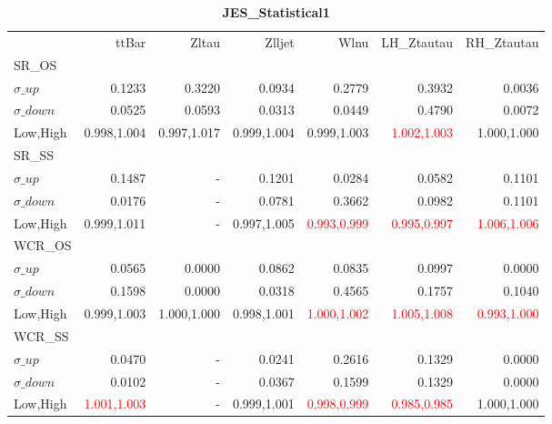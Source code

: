 \documentclass[11pt,oneside,a4paper]{article}
\begin{document}
\begin{table}
\caption{\bf{JES\_Statistical1}}
\centering
\begin{tabular}{lrrrrrr}
& ttBar & Zltau & Zlljet & Wlnu & LH\_Ztautau & RH\_Ztautau \\

SR\_OS &  &  &  &  &  &  \\
$\sigma\_up$ & 0.1233 & 0.3220 & 0.0934 & 0.2779 & 0.3932 & 0.0036 \\
$\sigma\_down$ & 0.0525 & 0.0593 & 0.0313 & 0.0449 & 0.4790 & 0.0072 \\
Low,High & 0.998,1.004 & 0.997,1.017 & 0.999,1.004 & 0.999,1.003 & \textcolor{red}{1.002,1.003} & 1.000,1.000 \\

\hline
SR\_SS &  &  &  &  &  &  \\
$\sigma\_up$ & 0.1487 & - & 0.1201 & 0.0284 & 0.0582 & 0.1101 \\
$\sigma\_down$ & 0.0176 & - & 0.0781 & 0.3662 & 0.0982 & 0.1101 \\
Low,High & 0.999,1.011 & - & 0.997,1.005 & \textcolor{red}{0.993,0.999} & \textcolor{red}{0.995,0.997} & \textcolor{red}{1.006,1.006} \\

\hline
WCR\_OS &  &  &  &  &  &  \\
$\sigma\_up$ & 0.0565 & 0.0000 & 0.0862 & 0.0835 & 0.0997 & 0.0000 \\
$\sigma\_down$ & 0.1598 & 0.0000 & 0.0318 & 0.4565 & 0.1757 & 0.1040 \\
Low,High & 0.999,1.003 & 1.000,1.000 & 0.998,1.001 & \textcolor{red}{1.000,1.002} & \textcolor{red}{1.005,1.008} & \textcolor{red}{0.993,1.000} \\

\hline
WCR\_SS &  &  &  &  &  &  \\
$\sigma\_up$ & 0.0470 & - & 0.0241 & 0.2616 & 0.1329 & 0.0000 \\
$\sigma\_down$ & 0.0102 & - & 0.0367 & 0.1599 & 0.1329 & 0.0000 \\
Low,High & \textcolor{red}{1.001,1.003} & - & 0.999,1.001 & \textcolor{red}{0.998,0.999} & \textcolor{red}{0.985,0.985} & 1.000,1.000 \\

\end{tabular}
\end{table}
\end{document}
